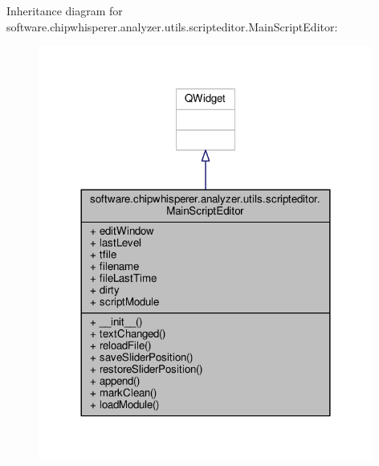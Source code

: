 Inheritance diagram for software.\+chipwhisperer.\+analyzer.\+utils.\+scripteditor.\+Main\+Script\+Editor\+:\nopagebreak
\begin{figure}[H]
\begin{center}
\leavevmode
\includegraphics[width=312pt]{d4/dc0/classsoftware_1_1chipwhisperer_1_1analyzer_1_1utils_1_1scripteditor_1_1MainScriptEditor__inherit__graph}
\end{center}
\end{figure}


